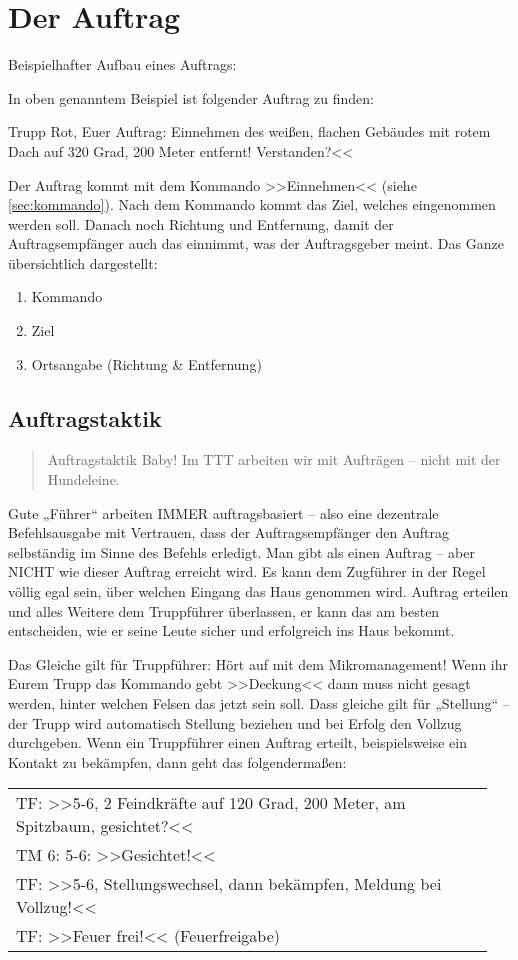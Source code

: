 \section{Der Auftrag}
\label{subsec:auftrag}
	Beispielhafter Aufbau eines Auftrags:\par
	In oben genanntem Beispiel ist folgender Auftrag zu finden:
	\begin{hint}
		Trupp Rot, Euer Auftrag: Einnehmen des weißen, flachen Gebäudes mit rotem Dach auf 320 Grad, 200 Meter entfernt! Verstanden?<<
	\end{hint}
	Der Auftrag kommt mit dem Kommando >>Einnehmen<< (siehe \ref{sec:kommando}). Nach dem Kommando kommt das Ziel, welches eingenommen werden soll. Danach noch Richtung und Entfernung, damit der Auftragsempfänger auch das einnimmt, was der Auftragsgeber meint. Das Ganze übersichtlich dargestellt:
	\begin{enumerate}
		\item Kommando
		\item Ziel
		\item Ortsangabe (Richtung \& Entfernung)
	\end{enumerate}

\subsection{Auftragstaktik}\hfil
	\begin{quote}
		\glqq Auftragstaktik Baby! Im \ac{TTT} arbeiten wir mit Aufträgen -- nicht mit der Hundeleine.\grqq
	\end{quote}
	Gute „Führer“ arbeiten IMMER auftragsbasiert -- also eine dezentrale Befehlsausgabe mit Vertrauen, dass der Auftragsempfänger den Auftrag selbständig im Sinne des Befehls erledigt. Man gibt als einen Auftrag – aber NICHT wie dieser Auftrag erreicht wird. Es kann dem Zugführer in der Regel völlig egal sein, über welchen Eingang das Haus genommen wird. Auftrag erteilen und alles Weitere dem Truppführer überlassen, er kann das am besten entscheiden, wie er seine Leute sicher und erfolgreich ins Haus bekommt.
	\par\medskip
	Das Gleiche gilt für Truppführer: Hört auf mit dem Mikromanagement! Wenn ihr Eurem Trupp das Kommando gebt >>Deckung<< dann muss nicht gesagt werden, hinter welchen Felsen das jetzt sein soll. Dass gleiche gilt für „Stellung“ – der Trupp wird automatisch Stellung beziehen und bei Erfolg den Vollzug durchgeben. Wenn ein Truppführer einen Auftrag erteilt, beispielsweise ein Kontakt zu bekämpfen, dann geht das folgendermaßen:
	\begin{longtable}{P{0.95\linewidth}}
		\toprule
		TF: >>5-6, 2 Feindkräfte auf 120 Grad, 200 Meter, am Spitzbaum, gesichtet?<<\\
		\rcg TM 6: 5-6: >>Gesichtet!<<\\
		TF: >>5-6, Stellungswechsel, dann bekämpfen, Meldung bei Vollzug!<<\\
		TF: >>Feuer frei!<< (Feuerfreigabe)\\
		\bottomrule
	\end{longtable}		
	
